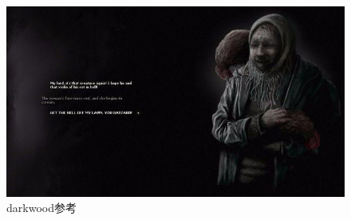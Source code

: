 \documentclass{ctexart}
\begin{document}
			\begin{figure}[H]
			\centering
			\includegraphics[scale=0.4]{material/美术参考人物1.jpeg}
			\caption{darkwood参考}
			\label{darkwood参考}
			\end{figure}
\end{document}
